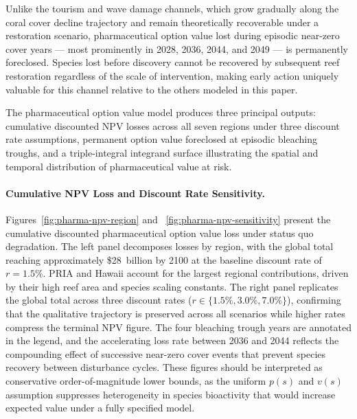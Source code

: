 \documentclass[10pt,letterpaper]{article}
\newcounter{assumption}
\begin{document}
Unlike the tourism and wave damage channels, which grow gradually along the coral cover decline trajectory and remain theoretically recoverable under a restoration scenario, pharmaceutical option value lost during episodic near-zero cover years --- most prominently in 2028, 2036, 2044, and 2049 --- is permanently foreclosed. Species lost before discovery cannot be recovered by subsequent reef restoration regardless of the scale of intervention, making early action uniquely valuable for this channel relative to the others modeled in this paper.

The pharmaceutical option value model produces three principal outputs: cumulative discounted NPV losses across all seven regions under three discount rate assumptions, permanent option value foreclosed at episodic bleaching troughs, and a triple-integral integrand surface illustrating the spatial and temporal distribution of pharmaceutical value at risk.

\paragraph{Cumulative NPV Loss and Discount Rate Sensitivity.}
Figures~\ref{fig:pharma-npv-region} and ~\ref{fig:pharma-npv-sensitivity} present the cumulative discounted pharmaceutical option value loss under status quo degradation. The left panel decomposes losses by region, with the global total reaching approximately \$28~billion by 2100 at the baseline discount rate of $r = 1.5\%$. PRIA and Hawaii account for the largest regional contributions, driven by their high reef area and species scaling constants. The right panel replicates the global total across three discount rates ($r \in \{1.5\%, 3.0\%, 7.0\%\}$), confirming that the qualitative trajectory is preserved across all scenarios while higher rates compress the terminal NPV figure. The four bleaching trough years are annotated in the legend, and the accelerating loss rate between 2036 and 2044 reflects the compounding effect of successive near-zero cover events that prevent species recovery between disturbance cycles. These figures should be interpreted as conservative order-of-magnitude lower bounds, as the uniform $p(s)$ and $v(s)$ assumption suppresses heterogeneity in species bioactivity that would increase expected value under a fully specified model.
\end{document}
